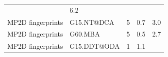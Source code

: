 \documentclass[utf8]{frontiersHLTH} %
\begin{document}
\begin{longtable}[]{@{}lllll@{}}
\begin{minipage}[t]{0.15\columnwidth}
\end{minipage} & \begin{minipage}[t]{0.08\columnwidth}\raggedright\strut
6.2\strut
\end{minipage}\tabularnewline
\begin{minipage}[t]{0.26\columnwidth}\raggedright\strut
MP2D fingerprints\strut
\end{minipage} & \begin{minipage}[t]{0.21\columnwidth}\raggedright\strut
G15.NT@DCA\strut
\end{minipage} & \begin{minipage}[t]{0.06\columnwidth}\raggedright\strut
5\strut
\end{minipage} & \begin{minipage}[t]{0.15\columnwidth}\raggedright\strut
0.7\strut
\end{minipage} & \begin{minipage}[t]{0.08\columnwidth}\raggedright\strut
3.0\strut
\end{minipage}\tabularnewline
\begin{minipage}[t]{0.26\columnwidth}\raggedright\strut
MP2D fingerprints\strut
\end{minipage} & \begin{minipage}[t]{0.21\columnwidth}\raggedright\strut
G60.MBA\strut
\end{minipage} & \begin{minipage}[t]{0.06\columnwidth}\raggedright\strut
5\strut
\end{minipage} & \begin{minipage}[t]{0.15\columnwidth}\raggedright\strut
0.5\strut
\end{minipage} & \begin{minipage}[t]{0.08\columnwidth}\raggedright\strut
2.7\strut
\end{minipage}\tabularnewline
\begin{minipage}[t]{0.26\columnwidth}\raggedright\strut
MP2D fingerprints\strut
\end{minipage} & \begin{minipage}[t]{0.21\columnwidth}\raggedright\strut
G15.DDT@ODA\strut
\end{minipage} & \begin{minipage}[t]{0.06\columnwidth}\raggedright\strut
1\strut
\end{minipage} & \begin{minipage}[t]{0.15\columnwidth}\raggedright\strut
1.1\strut
\end{minipage} & \begin{minipage}[t]{0.08\columnwidth}\raggedright\strut

\end{minipage}
\end{longtable}
\end{document}
